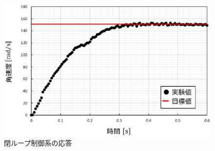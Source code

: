 \begin{figure}[htb]
  \centering
    \includegraphics[width=0.7\hsize]{picture/eps/pi_response.eps}
  \caption{閉ループ制御系の応答}
  \label{fig::pi_response}
  
\end{figure}
